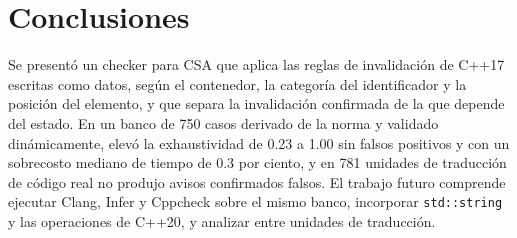 \documentclass[conference]{IEEEtran}
\newcommand{\code}[1]{\texttt{#1}}
\begin{document}
\section{Conclusiones}

Se presentó un checker para CSA que aplica las reglas de invalidación de C++17 escritas como datos, según el contenedor, la categoría del identificador y la posición del elemento, y que separa la invalidación confirmada de la que depende del estado. En un banco de 750 casos derivado de la norma y validado dinámicamente, elevó la exhaustividad de 0.23 a 1.00 sin falsos positivos y con un sobrecosto mediano de tiempo de 0.3 por ciento, y en 781 unidades de traducción de código real no produjo avisos confirmados falsos. El trabajo futuro comprende ejecutar Clang, Infer y Cppcheck sobre el mismo banco, incorporar \code{std::string} y las operaciones de C++20, y analizar entre unidades de traducción.
\end{document}
